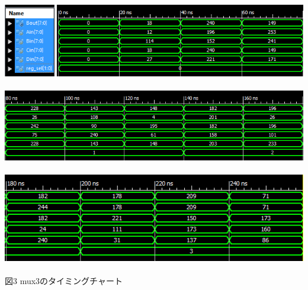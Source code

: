\documentclass[12pt]{jreport}
\begin{document}
        \begin{center}
            \includegraphics[width=18cm]{mux3_1.png} \\　\\
            \includegraphics[width=18cm]{mux3_2.png} \\　\\
            \includegraphics[width=18cm]{mux3_3.png} \\　\\
                図3 mux3のタイミングチャート
        \end{center} 
\end{document}
